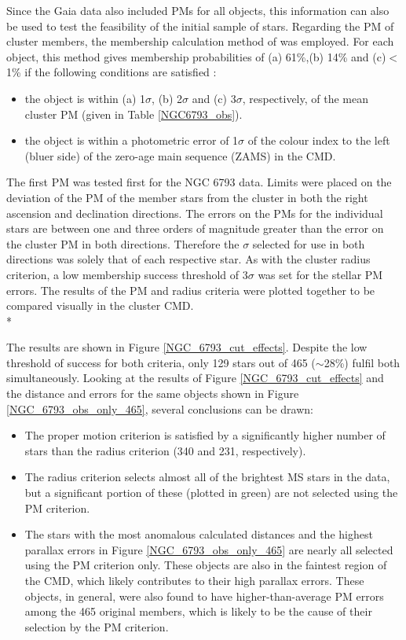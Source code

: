 \documentclass[12pt, a4paper]{report}
\begin{document}
Since the Gaia data also included PMs for all objects, this information can also be used to test the feasibility of the initial sample of stars. Regarding the PM of cluster members, the membership calculation method of \cite{2003ARep...47..263K} was employed. For each object, this method gives membership probabilities of (a) 61\%,(b) 14\% and (c)$<$1\% if the following conditions are satisfied \citep{2006A&A...446..949D}:

\begin{itemize}
\item the object is within (a) 1$\sigma$, (b) 2$\sigma$ and (c) 3$\sigma$, respectively, of the mean cluster PM (given in Table \ref{NGC6793_obs}).
\item the object is within a photometric error of 1$\sigma$ of the colour index to the left (bluer side) of the zero-age main sequence (ZAMS) in the CMD.
\end{itemize}

The first PM was tested first for the NGC 6793 data. Limits were placed on the deviation of the PM of the member stars from the cluster in both the right ascension and declination directions. The errors on the PMs for the individual stars are between one and three orders of magnitude greater than the error on the cluster PM in both directions. Therefore the $\sigma$ selected for use in both directions was solely that of each respective star. As with the cluster radius criterion, a low membership success threshold of 3$\sigma$ was set for the stellar PM errors. The results of the PM and radius criteria were plotted together to be compared visually in the cluster CMD.\\*

The results are shown in Figure \ref{NGC_6793_cut_effects}. Despite the low threshold of success for both criteria, only 129 stars out of 465 ($\sim$28\%) fulfil both simultaneously. Looking at the results of Figure \ref{NGC_6793_cut_effects} and the distance and errors for the same objects shown in Figure \ref{NGC_6793_obs_only_465}, several conclusions can be drawn:

\begin{itemize}
\item The proper motion criterion is satisfied by a significantly higher number of stars than the radius criterion (340 and 231, respectively).
\item The radius criterion selects almost all of the brightest MS stars in the data, but a significant portion of these (plotted in green) are not selected using the PM criterion.
\item The stars with the most anomalous calculated distances and the highest parallax errors in Figure \ref{NGC_6793_obs_only_465} are nearly all selected using the PM criterion only. These objects are also in the faintest region of the CMD, which likely contributes to their high parallax errors. These objects, in general, were also found to have higher-than-average PM errors among the 465 original members, which is likely to be the cause of their selection by the PM criterion.
\end{itemize}
\end{document}
